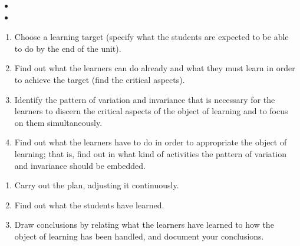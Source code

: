 \begin{frame}
  \begin{remark}
    \begin{itemize}
      \item<+> 
      \item<+> 
    \end{itemize}
  \end{remark}
\end{frame}

\begin{frame}
  \begin{example}
    \begin{enumerate}
      \item<+> Choose a learning target (specify what the students are expected 
        to be able to do by the end of the unit).
      \item<+> Find out what the learners can do already and what they must 
        learn in order to achieve the target (find the critical aspects).
      \item<+> Identify the pattern of variation and invariance that is 
        necessary for the learners to discern the critical aspects of the 
        object of learning and to focus on them simultaneously.
      \item<+> Find out what the learners have to do in order to appropriate 
        the object of learning; that is, find out in what kind of activities 
        the pattern of variation and invariance should be embedded.
        \saveenumi
    \end{enumerate}
  \end{example}
\end{frame}

\begin{frame}
  \begin{example}
    \begin{enumerate}
      \resumeenumi
      \item<+> Carry out the plan, adjusting it continuously.
      \item<+> Find out what the students have learned.
      \item<+> Draw conclusions by relating what the learners have learned to 
        how the object of learning has been handled, and document your 
        conclusions.
    \end{enumerate}
  \end{example}
\end{frame}

